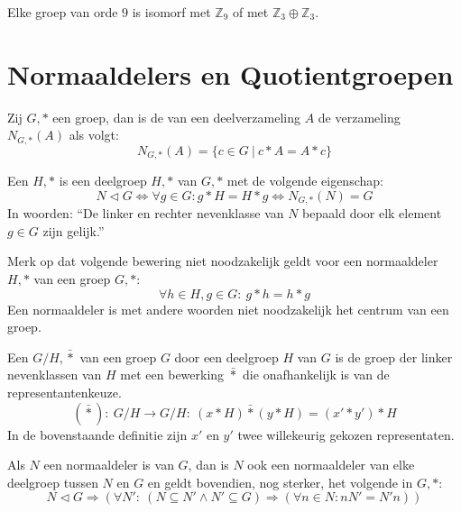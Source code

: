 \documentclass[main.tex]{subfiles}
\begin{document}
\begin{st}
  Elke groep van orde $9$ is isomorf met $\mathbb{Z}_{9}$ of met $\mathbb{Z}_{3} \oplus \mathbb{Z}_{3}$.
  
\end{st}

\section{Normaaldelers en Quotientgroepen}
\label{sec:normaaldelers-en-quotientgroepen}

\begin{de}
  Zij $G,*$ een groep, dan is de  van een deelverzameling $A$ de verzameling $N_{G,*}(A)$ als volgt:
  \[ N_{G,*}(A) = \{ c\in G \ |\ c*A = A*c \}\]
\end{de}

\begin{de}
  Een  $H,*$ is een deelgroep $H,*$ van $G,*$ met de volgende eigenschap:
  \[ N \triangleleft G \Leftrightarrow \forall g \in G: g*H = H*g \Leftrightarrow N_{G,*}(N) = G \]
  In woorden: ``De linker en rechter nevenklasse van $N$ bepaald door elk element $g\in G$ zijn gelijk.''
\end{de}

\begin{opm}
  Merk op dat volgende bewering niet noodzakelijk geldt voor een normaaldeler $H,*$ van een groep $G,*$:
  \[ \forall h \in H, g \in G:\ g*h = h*g \]
  Een normaaldeler is met andere woorden niet noodzakelijk het centrum van een groep.
\end{opm}

\begin{de}
  Een  $G/H,\bar{*}$ van een groep $G$ door een deelgroep $H$ van $G$ is de groep der linker nevenklassen van $H$ met een bewerking $\bar{*}$ die onafhankelijk is van de representantenkeuze.
  \[ (\bar{*}):\ G/H \rightarrow G/H:\ (x*H)\bar{*}(y*H) = (x' * y') * H \]
  In de bovenstaande definitie zijn $x'$ en $y'$ twee willekeurig gekozen representaten.
\end{de}

\begin{ei}
  \label{ei:normaaldelers-tussen-groep-en-deler}
  Als $N$ een normaaldeler is van $G$, dan is $N$ ook een normaaldeler van elke deelgroep tussen $N$ en $G$ en geldt bovendien, nog sterker, het volgende in $G,*$:
  \[ N \triangleleft G \Rightarrow (\forall N':\ (N \subseteq N' \wedge N' \subseteq G) \Rightarrow (\forall n\in N: nN' = N'n)) \]
\end{ei}
\end{document}
